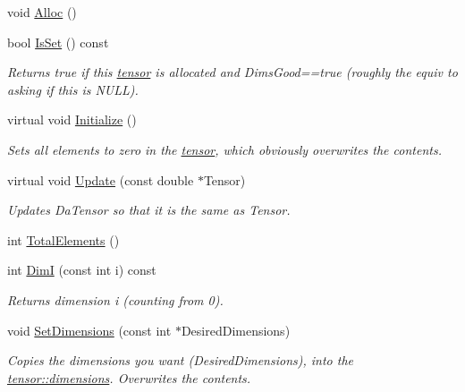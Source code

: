 \begin{DoxyCompactItemize}
void \hyperlink{classJKBuilder_1_1tensor_a0ca5cbe96d2a61f06ae4b543ef84f166}{Alloc} ()
\item 
bool \hyperlink{classJKBuilder_1_1tensor_a79c9a36acc5dbeab94033ca97971dc09}{IsSet} () const 
\begin{DoxyCompactList}\small\item\em Returns true if this \hyperlink{classJKBuilder_1_1tensor}{tensor} is allocated and DimsGood==true (roughly the equiv to asking if this is NULL). \item\end{DoxyCompactList}\item 
virtual void \hyperlink{classJKBuilder_1_1tensor_a98b1050f09da390896f964fb7a892391}{Initialize} ()
\begin{DoxyCompactList}\small\item\em Sets all elements to zero in the \hyperlink{classJKBuilder_1_1tensor}{tensor}, which obviously overwrites the contents. \item\end{DoxyCompactList}\item 
virtual void \hyperlink{classJKBuilder_1_1tensor_a10ffea2bf428adfa3e8319646c44a3c6}{Update} (const double $\ast$Tensor)
\begin{DoxyCompactList}\small\item\em Updates DaTensor so that it is the same as Tensor. \item\end{DoxyCompactList}\item 
int \hyperlink{classJKBuilder_1_1tensor_a537b2f14296e2f0e62f00e1703c5fa08}{TotalElements} ()
\item 
int \hyperlink{classJKBuilder_1_1tensor_a6bdcfca6493bc217b607317dbceb28b2}{DimI} (const int i) const 
\begin{DoxyCompactList}\small\item\em Returns dimension i (counting from 0). \item\end{DoxyCompactList}\item 
void \hyperlink{classJKBuilder_1_1tensor_ace6bcf62c74395ab9e37abc4935f66e0}{SetDimensions} (const int $\ast$DesiredDimensions)
\begin{DoxyCompactList}\small\item\em Copies the dimensions you want (DesiredDimensions), into the \hyperlink{classJKBuilder_1_1tensor_a2ce1e6e0782ddee097f2c4aa2663d3e9}{tensor::dimensions}. Overwrites the contents. \item\end{DoxyCompactList}\item 

\end{DoxyCompactItemize}
